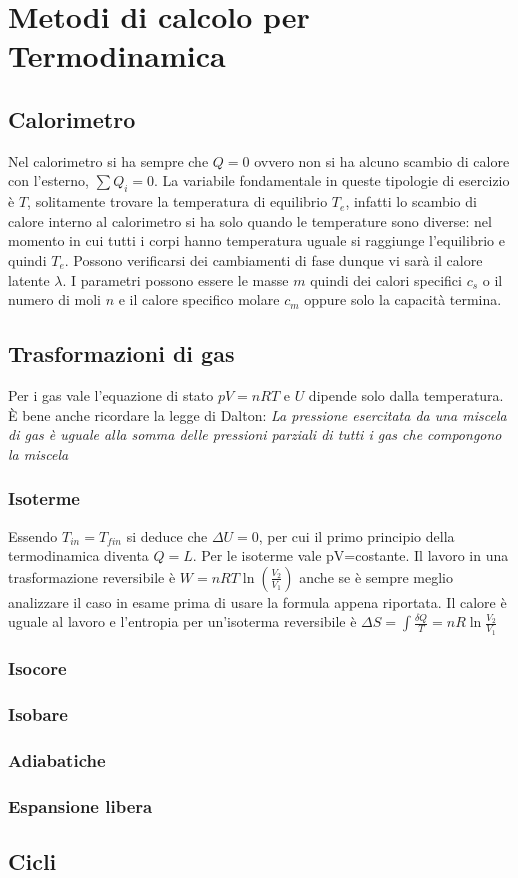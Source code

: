 \documentclass{article}
\begin{document}
\section*{Metodi di calcolo per Termodinamica}
\subsection*{Calorimetro}
Nel calorimetro si ha sempre che $Q=0$ ovvero non si ha alcuno scambio di calore con l'esterno, $\sum Q_i=0$. La variabile fondamentale in queste tipologie di esercizio è $T$, solitamente trovare la temperatura di equilibrio $T_e$, infatti lo scambio di calore interno al calorimetro si ha solo quando le temperature sono diverse: nel momento in cui tutti i corpi hanno temperatura uguale si raggiunge l'equilibrio e quindi $T_e$. Possono verificarsi dei cambiamenti di fase dunque vi sarà il calore latente $\lambda$. I parametri possono essere le masse $m$ quindi dei calori specifici $c_s$ o il numero di moli $n$ e il calore specifico molare $c_m$ oppure solo la capacità termina. 

\subsection*{Trasformazioni di gas}
Per i gas vale l'equazione di stato $pV=nRT$ e $U$ dipende solo dalla temperatura. È bene anche ricordare la legge di Dalton: \textit{La pressione esercitata da una miscela di gas è uguale alla somma delle pressioni parziali di tutti i gas che compongono la miscela}
\subsubsection*{Isoterme}
Essendo $T_{in}=T_{fin}$ si deduce che $\Delta U=0$, per cui il primo principio della termodinamica diventa $Q=L$. Per le isoterme vale pV=costante. Il lavoro in una trasformazione reversibile è $W=nRT\ln(\frac{V_2}{V_1})$ anche se è sempre meglio analizzare il caso in esame prima di usare la formula appena riportata. Il calore è uguale al lavoro e l'entropia per un'isoterma reversibile è $\Delta S=\int \frac{\delta Q}{T}=nR\ln{\frac{V_2}{V_1}}$
\subsubsection*{Isocore}
\subsubsection*{Isobare}
\subsubsection*{Adiabatiche}
\subsubsection{Espansione libera}

\subsection*{Cicli}
\end{document}

